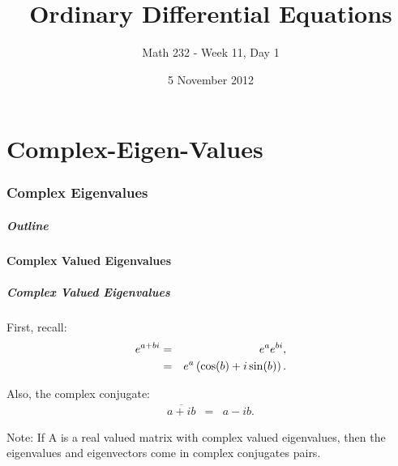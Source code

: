 \part{Complex-Eigen-Values}
\section{Complex Eigenvalues}


\title{Ordinary Differential Equations}
\subtitle{Math 232 - Week 11, Day 1}
\date{5 November 2012}

\begin{frame}
  \titlepage
\end{frame}

\begin{frame}
  \frametitle{Outline}
\end{frame}


\subsection{Complex Valued Eigenvalues}


\begin{frame}
  \frametitle{Complex Valued Eigenvalues}

  First, recall:
  \begin{eqnarray*}
    e^{a+bi} & = & e^a e^{bi}, \\
    & = & e^a \left( \cos(b) + i \sin(b) \right).
  \end{eqnarray*}

  Also, the complex conjugate:
  \begin{eqnarray*}
    \overline{a+ib} & = & a-i b.
  \end{eqnarray*}

  Note: If A is a real valued matrix with complex valued eigenvalues,
  then the eigenvalues and eigenvectors come in complex conjugates
  pairs.

\end{frame}


